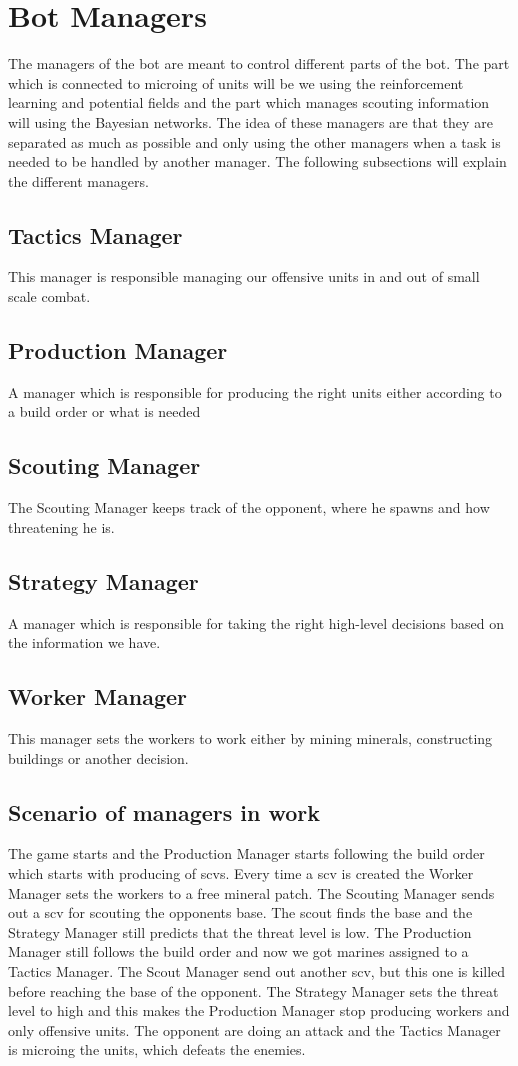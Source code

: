 \section{Bot Managers}
	The managers of the bot are meant to control different parts of the bot. The part which is connected to microing of units will be we using the 
	reinforcement learning and potential fields and the part which manages scouting information will using the Bayesian networks. 
	The idea of these managers are that they are separated as much as possible and only using the other managers when a task is needed to be handled 
	by another manager. The following subsections will explain the different managers.
	
	\subsection*{Tactics Manager}
		This manager is responsible managing our offensive units in and out of small scale combat.
	\subsection*{Production Manager}
		A manager which is responsible for producing the right units either according to a build order or what is needed
	\subsection*{Scouting Manager}
		The Scouting Manager keeps track of the opponent, where he spawns and how threatening he is.
	\subsection*{Strategy Manager}
		A manager which is responsible for taking the right high-level decisions based on the information we have.
	\subsection*{Worker Manager}
		This manager sets the workers to work either by mining minerals, constructing buildings or another decision.

	\subsection{Scenario of managers in work}
		The game starts and the Production Manager starts following the build order which starts with producing of scvs. Every time a scv is created the 
		Worker Manager sets the workers to a free mineral patch. The Scouting Manager sends out a scv for scouting the opponents base. The scout 
		finds the base and the Strategy Manager still predicts that the threat level is low. The Production Manager still follows the build order and now 
		we got marines assigned to a Tactics Manager. The Scout Manager send out another scv, but this one is killed before reaching the base of the 
		opponent. The Strategy Manager sets the threat level to high and this makes the Production Manager stop producing workers and only offensive units. 
		The opponent are doing an attack and the Tactics Manager is microing the units, which defeats the enemies.